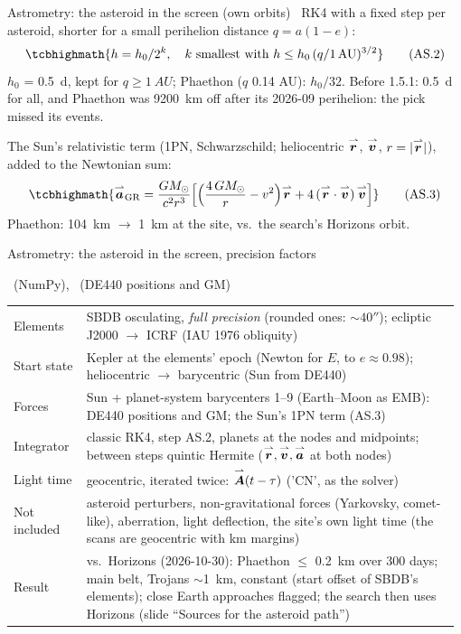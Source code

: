 \begin{frame}{Astrometry: the asteroid in the screen (own orbits)}
  \footnotesize
  \OWN\ RK4 with a fixed step per asteroid, shorter for a small perihelion distance $q = a(1-e)$:
  \[
    \tcbhighmath{h = h_0 / 2^{k},\quad k \text{ smallest with } h \le h_0\,(q / \SI{1}{AU})^{3/2}}
    \tag{AS.2}
  \]
  {\scriptsize $h_0$ = \SI{0.5}{d}, kept for $q \ge \SI{1}{AU}$; Phaethon ($q$ 0.14 AU): $h_0/32$. Before 1.5.1:
  \SI{0.5}{d} for all, and Phaethon was \SI{9200}{km} off after its 2026-09 perihelion: the pick missed its events.}
  \bigskip

  The Sun's relativistic term (1PN, Schwarzschild; heliocentric $\overset{\rightharpoonup}{\bm{r}}$, $\overset{\rightharpoonup}{\bm{v}}$, $r = |\overset{\rightharpoonup}{\bm{r}}|$), added to the
  Newtonian sum:
  \[
    \tcbhighmath{\vv{a}_{\mathrm{GR}} = \frac{GM_\odot}{c^2 r^3}\Bigl[\Bigl(\frac{4\,GM_\odot}{r} - v^2\Bigr)\vv{r}
      + 4\,(\vv{r}\cdot\vv{v})\,\vv{v}\Bigr]}
    \tag{AS.3}
  \]
  {\scriptsize Phaethon: \SI{104}{km} $\to$ \SI{1}{km} at the site, vs.\ the search's Horizons orbit.}
\end{frame}

\begin{frame}{Astrometry: the asteroid in the screen, precision factors}
  {\footnotesize \OWN\ (NumPy), \SP\ (DE440 positions and GM)\\[0.3ex]
  \renewcommand{\arraystretch}{1.25}
  \begin{tabular}{@{}>{\raggedright\arraybackslash}p{0.16\linewidth} >{\raggedright\arraybackslash}p{0.82\linewidth}@{}}
    Elements & SBDB osculating, \emph{full precision} (rounded ones: $\sim 40''$); ecliptic J2000 $\to$ ICRF (IAU 1976 obliquity) \\
    Start state & Kepler at the elements' epoch (Newton for $E$, to $e \approx 0.98$); heliocentric $\to$ barycentric (Sun from DE440) \\
    Forces & Sun + planet-system barycenters 1--9 (Earth--Moon as EMB): DE440 positions and GM; the Sun's 1PN term (AS.3) \\
    Integrator & classic RK4, step AS.2, planets at the nodes and midpoints; between steps quintic Hermite ($\overset{\rightharpoonup}{\bm{r}}, \overset{\rightharpoonup}{\bm{v}}, \overset{\rightharpoonup}{\bm{a}}$ at both nodes) \\
    Light time & geocentric, iterated twice: $\overset{\rightharpoonup}{\bm{A}}(t - \tau)$ ('CN', as the solver) \\
    Not included & asteroid perturbers, non-gravitational forces (Yarkovsky, comet-like), aberration, light deflection,
                   the site's own light time (the scans are geocentric with km margins) \\
    Result & vs.\ Horizons (2026-10-30): Phaethon $\le$ \SI{0.2}{km} over 300 days; main belt, Trojans
             $\sim$\SI{1}{km}, constant (start offset of SBDB's elements); close Earth approaches flagged; the search
             then uses Horizons (slide ``Sources for the asteroid path'') \\
  \end{tabular}}
\end{frame}

